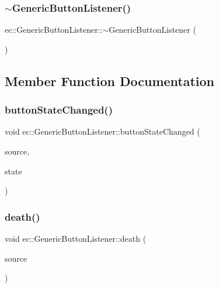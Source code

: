\subsubsection{\texorpdfstring{$\sim$\+Generic\+Button\+Listener()}{~GenericButtonListener()}}
{\footnotesize\ttfamily ec\+::\+Generic\+Button\+Listener\+::$\sim$\+Generic\+Button\+Listener (\begin{DoxyParamCaption}{ }\end{DoxyParamCaption})\hspace{0.3cm}{\ttfamily [default]}}



\subsection{Member Function Documentation}
\mbox{\label{classec_1_1_generic_button_listener_a3ee5c4b3d94c44007fe530c96b403193}} 
\subsubsection{\texorpdfstring{button\+State\+Changed()}{buttonStateChanged()}}
{\footnotesize\ttfamily void ec\+::\+Generic\+Button\+Listener\+::button\+State\+Changed (\begin{DoxyParamCaption}\item[{agui\+::\+Button $\ast$}]{source,  }\item[{agui\+::\+Button\+::\+Button\+State\+Enum}]{state }\end{DoxyParamCaption})\hspace{0.3cm}{\ttfamily [override]}}

\mbox{\label{classec_1_1_generic_button_listener_a21f4b1a65d80f3f715a3f4ce51dce39e}} 
\subsubsection{\texorpdfstring{death()}{death()}}
{\footnotesize\ttfamily void ec\+::\+Generic\+Button\+Listener\+::death (\begin{DoxyParamCaption}\item[{agui\+::\+Button $\ast$}]{source }\end{DoxyParamCaption})\hspace{0.3cm}{\ttfamily [override]}}

